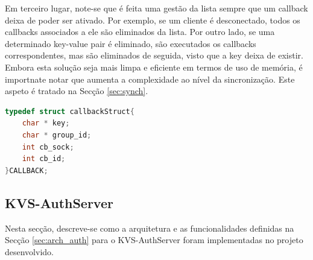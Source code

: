 Em terceiro lugar, note-se que é feita uma gestão da lista sempre que um callback deixa de poder ser ativado. Por exemplo, se um cliente é desconectado, todos os callbacks associados a ele são eliminados da lista. Por outro lado, se uma determinado key-value pair é eliminado, são executados os callbacks correspondentes, mas são eliminados de seguida, visto que a key deixa de existir. Embora esta solução seja mais limpa e eficiente em termos de uso de memória, é importnate notar que aumenta a complexidade ao nível da sincronização. Este aspeto é tratado na Secção \ref{sec:synch}. 

\begin{lstlisting}[language=C,label={lst_callback_server_struct},caption=Estrutura \texttt{CALLBACK} para a gestão de callbacks no KVS-LocalServer.]
typedef struct callbackStruct{
    char * key;
    char * group_id;
    int cb_sock;
    int cb_id;
}CALLBACK;
\end{lstlisting}



\subsection{KVS-AuthServer}\label{sec:kvsauth}


Nesta secção, descreve-se como a arquitetura e as funcionalidades definidas na Secção \ref{sec:arch_auth} para o KVS-AuthServer foram implementadas no projeto desenvolvido. 


